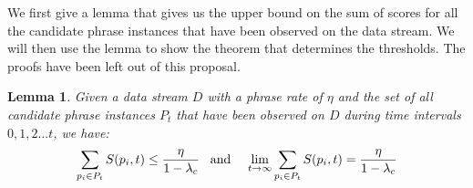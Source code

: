\documentclass{sig-alternate}
\newtheorem{lemma}{Lemma}[section]
\begin{document}
We first give a lemma that gives us the upper bound on the sum of scores for all the candidate phrase instances that have been observed on the data stream. We will then use the lemma to show the theorem that determines the thresholds. The proofs have been left out of this proposal.

\begin{lemma}
Given a data stream $D$ with a phrase rate of $\eta$ and the set of all candidate phrase instances $P_t$ that have been observed on $D$ during time intervals $0,1,2... t$, we have:
\begin{align*}
\sum_{p_i \in P_t}S(p_i, t) \leq \frac{\eta}{1-\lambda_c} \hspace{0.07in} \text{ and } \hspace{0.07in} \
\lim_{t \rightarrow \infty}{\sum_{p_i \in P_t}S(p_i, t)} = \frac{\eta}{1-\lambda_c}
\end{align*}
\label{cor:threshold}
\end{lemma}
%
%
\end{document}
